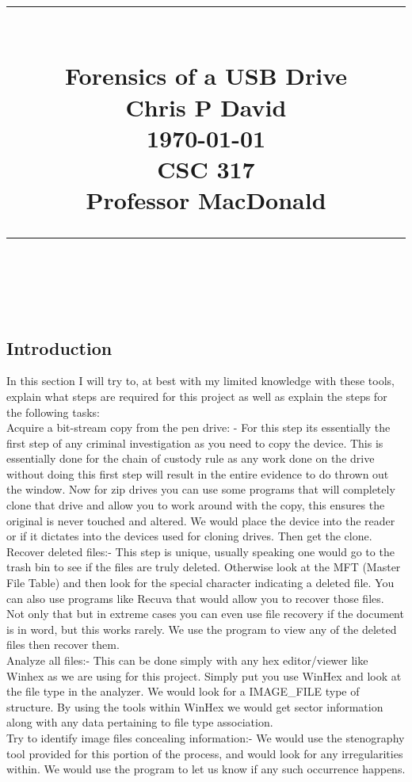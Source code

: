 \documentclass[12ptletterpaper]{paper}
\title{
	\begin{center}
		\normalfont \normalsize
		\rule{\linewidth}{.5pt} \\[0.4cm] 
		\huge {Forensics of a USB Drive} \\ 
		\small{Chris P David}\\
		{\today}\\
		{CSC 317}\\
		{Professor MacDonald}
		\rule{\linewidth}{.5pt} \\
	\end{center}
}
\newcommand\tab[1][1cm]{\hspace*{#1}}
\begin{document}
	\begin{titlepage}
		\clearpage
		\maketitle
		\thispagestyle{empty}
	\end{titlepage}
	\pagebreak	
	\tableofcontents
	\begin{flushleft}
		\pagebreak
		\section{Introduction}
		\tab In this section I will try to, at best with my limited knowledge with these tools, explain what steps are required for this project as well as explain the steps for the following tasks:\\
		\tab Acquire a bit-stream copy from the pen drive: - For this step its essentially the first step of any criminal investigation as you need to copy the device. This is essentially done for the chain of custody rule as any work done on the drive without doing this first step will result in the entire evidence to do thrown out the window. Now for zip drives you can use some programs that will completely clone that drive and allow you to work around with the copy, this ensures the original is never touched and altered. We would place the device into the reader or if it dictates into the devices used for cloning drives. Then get the clone.\\
		\tab Recover deleted files:- This step is unique, usually speaking one would go to the trash bin to see if the files are truly deleted. Otherwise look at the MFT (Master File Table) and then look for the special character indicating a deleted file. You can also use programs like Recuva that would allow you to recover those files. Not only that but in extreme cases you can even use file recovery if the document is in word, but this works rarely. We use the program to view any of the deleted files then recover them.\\
		\tab Analyze all files:- This can be done simply with any hex editor/viewer like Winhex as we are using for this project. Simply put you use WinHex and look at the file type in the analyzer. We would look for a IMAGE\_FILE type of structure. By using the tools within WinHex we would get sector information along with any data pertaining to file type association.\\
		\tab Try to identify image files concealing information:- We would use the stenography tool provided for this portion of the process, and would look for any irregularities within. We would use the program to let us know if any such occurrence happens.\\

\end{flushleft}
\end{document}
